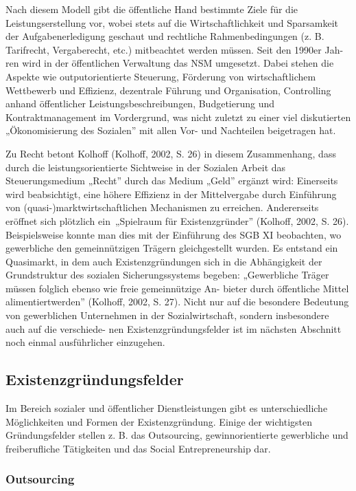 \documentclass[
  letterpaper,
]{book}
\begin{document}
Nach diesem Modell gibt die öffentliche Hand bestimmte Ziele für die
Leistungserstellung vor, wobei stets auf die Wirtschaftlichkeit und
Sparsamkeit der Aufgabenerledigung geschaut und rechtliche
Rahmenbedingungen (z. B. Tarifrecht, Vergaberecht, etc.) mitbeachtet
werden müssen. Seit den 1990er Jah- ren wird in der öffentlichen
Verwaltung das NSM umgesetzt. Dabei stehen die Aspekte wie
outputorientierte Steuerung, Förderung von wirtschaftlichem Wettbewerb
und Effizienz, dezentrale Führung und Organisation, Controlling anhand
öffentlicher Leistungsbeschreibungen, Budgetierung und
Kontraktmanagement im Vordergrund, was nicht zuletzt zu einer viel
diskutierten „Ökonomisierung des Sozialen'' mit allen Vor- und
Nachteilen beigetragen hat.

Zu Recht betont Kolhoff (Kolhoff, 2002, S. 26) in diesem Zusammenhang,
dass durch die leistungsorientierte Sichtweise in der Sozialen Arbeit
das Steuerungsmedium „Recht'' durch das Medium „Geld'' ergänzt wird:
Einerseits wird beabsichtigt, eine höhere Effizienz in der Mittelvergabe
durch Einführung von (quasi-)marktwirtschaftlichen Mechanismen zu
erreichen. Andererseits eröffnet sich plötzlich ein~„Spielraum für
Existenzgründer'' (Kolhoff, 2002, S. 26). Beispielsweise konnte man dies
mit der Einführung des SGB XI beobachten, wo gewerbliche den
gemeinnützigen Trägern gleichgestellt wurden. Es entstand ein
Quasimarkt, in dem auch Existenzgründungen sich in die Abhängigkeit der
Grundstruktur des sozialen Sicherungssystems begeben: „Gewerbliche
Träger müssen folglich ebenso wie freie gemeinnützige An- bieter durch
öffentliche Mittel alimentiertwerden'' (Kolhoff, 2002, S. 27). Nicht nur
auf die besondere Bedeutung von gewerblichen Unternehmen in der
Sozialwirtschaft, sondern insbesondere auch auf die verschiede- nen
Existenzgründungsfelder ist im nächsten Abschnitt noch einmal
ausführlicher einzugehen.

\subsection{Existenzgründungsfelder}\label{existenzgrndungsfelder}

Im Bereich sozialer und öffentlicher Dienstleistungen gibt es
unterschiedliche Möglichkeiten und Formen der Existenzgründung. Einige
der wichtigsten Gründungsfelder stellen z. B. das Outsourcing,
gewinnorientierte gewerbliche und freiberufliche Tätigkeiten und das
Social Entrepreneurship dar.

\subsubsection{Outsourcing}\label{outsourcing}
\end{document}
